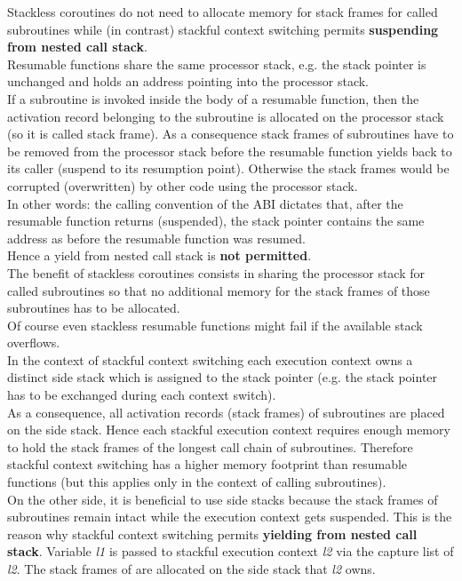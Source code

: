 Stackless coroutines do not need to allocate memory for stack frames for called
subroutines while (in contrast) stackful context switching permits {\bfseries
suspending from nested call stack}.\\
\newline
Resumable functions share the same processor stack, e.g. the stack pointer is
unchanged and holds an address pointing into the processor stack.\\
If a subroutine is invoked inside the body of a resumable function, then the
activation record belonging to the subroutine is allocated on the processor
stack (so it is called stack frame). As a consequence stack frames of
subroutines have to be removed from the processor stack before the resumable
function yields back to its caller (suspend to its resumption point). Otherwise
the stack frames would be corrupted (overwritten) by other code using the
processor stack.\\
In other words: the calling convention of the ABI dictates that, after the
resumable function returns (suspended), the stack pointer contains the same
address as before the resumable function was resumed.\\
Hence a yield from nested call stack is {\bfseries not permitted}.\\
The benefit of stackless coroutines consists in sharing the processor stack
for called subroutines so that no additional memory for the stack frames of
those subroutines has to be allocated.\\
\newline
Of course even stackless resumable functions might fail if the available stack
overflows.\\
\newline
In the context of stackful context switching each execution context owns a
distinct side stack which is assigned to the stack pointer (e.g. the stack
pointer has to be exchanged during each context switch).\\
As a consequence, all activation records (stack frames) of subroutines are
placed on the side stack. Hence each stackful execution context requires
enough memory to hold the stack frames of the longest call chain of subroutines.
Therefore stackful context switching has a higher memory footprint than
resumable functions (but this applies only in the context of calling
subroutines).\\
On the other side, it is beneficial to use side stacks because the stack frames
of subroutines remain intact while the execution context gets suspended. This is
the reason why stackful context switching permits {\bfseries yielding from
nested call stack}.
Variable \emph{l1} is passed to stackful execution context \emph{l2} via
the capture list of \emph{l2}. The stack frames of  are
allocated on the side stack that \emph{l2} owns.

